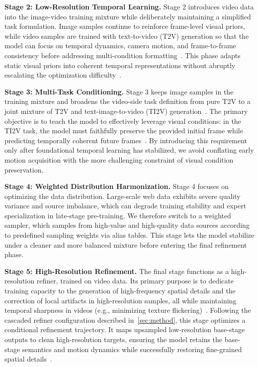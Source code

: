 \noindent\textbf{Stage 2: Low-Resolution Temporal Learning.}
Stage 2 introduces video data into the image-video training mixture while deliberately maintaining a simplified task formulation. Image samples continue to reinforce frame-level visual priors, while video samples are trained with text-to-video (T2V) generation so that the model can focus on temporal dynamics, camera motion, and frame-to-frame consistency before addressing multi-condition formatting~\cite{ho2022video,bar2024lumiere}. This phase adapts static visual priors into coherent temporal representations without abruptly escalating the optimization difficulty~\cite{singer2022make,guo2023animatediff}.

\noindent\textbf{Stage 3: Multi-Task Conditioning.}
Stage 3 keeps image samples in the training mixture and broadens the video-side task definition from pure T2V to a joint mixture of T2V and text-image-to-video (TI2V) generation~\cite{blattmann2023stable,wan2025wan2}. The primary objective is to teach the model to effectively leverage visual conditions: in the TI2V task, the model must faithfully preserve the provided initial frame while predicting temporally coherent future frames~\cite{esser2023structure,wan2025wan2}. By introducing this requirement only after foundational temporal learning has stabilized, we avoid conflating early motion acquisition with the more challenging constraint of visual condition preservation.

\noindent\textbf{Stage 4: Weighted Distribution Harmonization.} 
Stage 4 focuses on optimizing the data distribution. Large-scale web data exhibits severe quality variance and source imbalance, which can degrade training stability and expert specialization in late-stage pre-training. We therefore switch to a weighted sampler, which samples from high-value and high-quality data sources according to predefined sampling weights via alias tables. This stage lets the model stabilize under a cleaner and more balanced mixture before entering the final refinement phase.

\noindent\textbf{Stage 5: High-Resolution Refinement.}
The final stage functions as a high-resolution refiner, trained on video data. Its primary purpose is to dedicate training capacity to the generation of high-frequency spatial details and the correction of local artifacts in high-resolution samples, all while maintaining temporal sharpness in videos (e.g., minimizing texture flickering)~\cite{saharia2021sr3,ho2022imagen,flashvideo}. Following the cascaded refiner configuration described in~\cref{sec:method}, this stage optimizes a conditional refinement trajectory. It maps upsampled low-resolution base-stage outputs to clean high-resolution targets, ensuring the model retains the base-stage semantics and motion dynamics while successfully restoring fine-grained spatial details~\cite{blattmann2023stable,flashvideo}.



